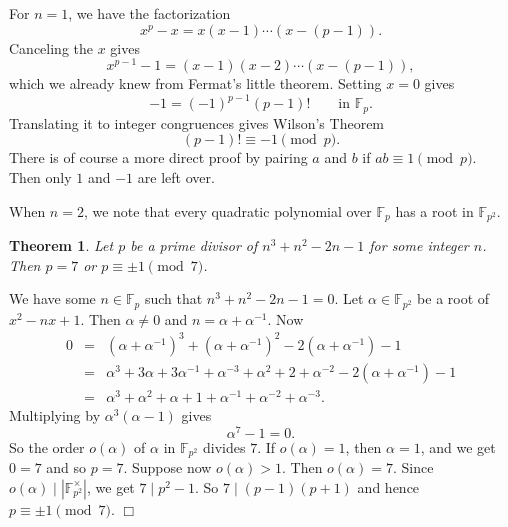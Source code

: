 \documentclass{article}
\def\F{{\mathbb F}}
\def\F{{\mathbb F}}
\newtheorem{theorem}[subsection]{Theorem}
\newenvironment{proof}{\noindent {\bf Proof:}}{$\Box$ \vspace{2 ex}}
\begin{document}
For $n = 1$, we have the factorization
$$x^p - x = x(x - 1)\cdots(x - (p-1)).$$
Canceling the $x$ gives $$x^{p-1} - 1 = (x - 1)(x - 2)\cdots(x - (p-1)),$$
which we already knew from Fermat's little theorem. Setting $x = 0$ gives $$-1 = (-1)^{p-1}(p-1)!\qquad\mbox{in }\F_p.$$
Translating it to integer congruences gives Wilson's Theorem
$$(p-1)!\equiv -1\pmod{p}.$$
There is of course a more direct proof by pairing $a$ and $b$ if $ab\equiv 1\pmod{p}$. Then only $1$ and $-1$ are left over.

\begin{comment}
    The case $n = 2$ is particularly interesting. There are $(p^2 - p)/2$ monic irreducible quadratic polynomials. We assume $p>2$. Then we may complete the square of any monic quadratic polynomial as
$$x^2 + ax + b = \Big(x + \frac{a}{2}\Big)^2 - \Big(\frac{a^2}{4} - b\Big).$$
Here the fractions can be viewed as multiplications by $2^{-1}$ and $4^{-1}$ in $\F_p$. Now a quadratic of the form $x^2 - c$ is irreducible if and only if $c$ is not a square in $\F_p$. We say a congruence class $c$ mod $p$ is a \textbf{quadratic residue} mod $p$ if $c$ is a square in $\F_p$; otherwise, we say it is a \textbf{quadratic non-residue}. We see that each quadratic non-residue $c$ gives rise to $p$ irreducible polynomials of the form $(x + a)^2 - c$. Hence, there are $\frac{p-1}{2}$ quadratic non-residues, and $\frac{p+1}{2}$ quadratic residues. If we remove $0$ mod $p$, then there is an equal number of them. Moreover, we know that every quadratic polynomial has a root in $\F_{p^2}$. 
\end{comment}

When $n = 2$, we note that every quadratic polynomial over $\F_p$ has a root in $\F_{p^2}$. 


\begin{theorem}
    Let $p$ be a prime divisor of $n^3 + n^2 - 2n - 1$ for some integer $n$. Then $p = 7$ or $p\equiv \pm1\pmod{7}$.
\end{theorem}

\begin{proof}
    We have some $n\in\F_p$ such that $n^3 + n^2 - 2n - 1 = 0$. Let $\alpha\in\F_{p^2}$ be a root of $x^2 - nx + 1.$ Then $\alpha\neq 0$ and $n = \alpha + \alpha^{-1}$. Now
    \begin{eqnarray*}
        0 &=& (\alpha + \alpha^{-1})^3 + (\alpha + \alpha^{-1})^2 - 2(\alpha + \alpha^{-1}) - 1\\
        &=& \alpha^3 + 3\alpha + 3\alpha^{-1} + \alpha^{-3} + \alpha^2 + 2 + \alpha^{-2} - 2(\alpha + \alpha^{-1}) - 1\\
        &=& \alpha^3 + \alpha^2 + \alpha + 1 + \alpha^{-1} + \alpha^{-2} + \alpha^{-3}.
    \end{eqnarray*}
    Multiplying by $\alpha^3(\alpha-1)$ gives $$\alpha^7 - 1 = 0.$$
    So the order $o(\alpha)$ of $\alpha$ in $\F_{p^2}$ divides $7$. If $o(\alpha) = 1$, then $\alpha = 1$, and we get $0 = 7$ and so $p = 7$. Suppose now $o(\alpha) > 1$. Then $o(\alpha) = 7$. Since $o(\alpha)\mid|\F_{p^2}^\times|$, we get $7\mid p^2 - 1.$ So $7\mid (p-1)(p+1)$ and hence $p\equiv \pm1\pmod{7}$. 
\end{proof}
\end{document}
